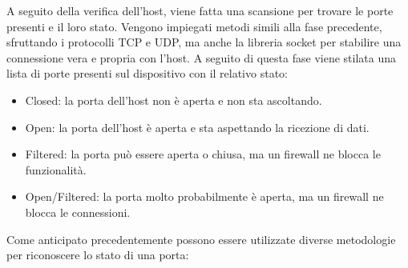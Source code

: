 \documentclass[12pt]{report}
\begin{document}
A seguito della verifica dell'host, viene fatta una scansione per trovare le porte presenti e il loro stato. Vengono impiegati metodi simili alla fase precedente, sfruttando i protocolli TCP e UDP, ma anche la libreria socket per stabilire una connessione vera e propria con l'host. A seguito di questa fase viene stilata una lista di porte presenti sul dispositivo con il relativo stato:
\begin{itemize}
    \item Closed: la porta dell'host non è aperta e non sta ascoltando.
    \item Open: la porta dell'host è aperta e sta aspettando la ricezione di dati.
    \item Filtered: la porta può essere aperta o chiusa, ma un firewall ne blocca le funzionalità.
    \item Open/Filtered: la porta molto probabilmente è aperta, ma un firewall ne blocca le connessioni.
\end{itemize}
Come anticipato precedentemente possono essere utilizzate diverse metodologie per riconoscere lo stato di una porta:
\end{document}
